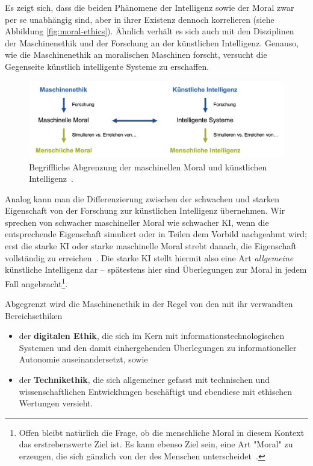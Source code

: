 \documentclass[twocolumn, german]{tum-article}
\begin{document}
Es zeigt sich, dass die beiden Phänomene der Intelligenz sowie der Moral zwar per se unabhängig sind, aber in ihrer Existenz dennoch korrelieren (siehe Abbildung \vref{fig:moral-ethics}).
Ähnlich verhält es sich auch mit den Disziplinen der Maschinenethik und der Forschung an der künstlichen Intelligenz.
Genauso, wie die Maschinenethik an moralischen Maschinen forscht, versucht die Gegenseite künstlich intelligente Systeme zu erschaffen.

\begin{figure}
	\includegraphics[width=\textwidth]{media/eth-int}
	\caption{Begriffliche Abgrenzung der maschinellen Moral und künstlichen Intelligenz~\cite[S. 17]{bendel-mascheth}.}
	\label{fig:moral-ethics}
\end{figure}

Analog kann man die Differenzierung zwischen der schwachen und starken Eigenschaft von der Forschung zur künstlichen Intelligenz übernehmen.
Wir sprechen von schwacher maschineller Moral wie schwacher KI, wenn die entsprechende Eigenschaft simuliert oder in Teilen dem Vorbild nachgeahmt wird; erst die starke KI oder starke maschinelle Moral strebt danach, die Eigenschaft vollständig zu erreichen~\cite[S. 17]{bendel-mascheth}.
Die starke KI stellt hiermit also eine Art \emph{allgemeine} künstliche Intelligenz dar -- spätestens hier sind Überlegungen zur Moral in jedem Fall angebracht\footnote{Offen bleibt natürlich die Frage, ob die menschliche Moral in diesem Kontext das erstrebenswerte Ziel ist. Es kann ebenso Ziel sein, eine Art "Moral" zu erzeugen, die sich gänzlich von der des Menschen unterscheidet~\cite[S. 23]{bendel-mascheth}.}.

Abgegrenzt wird die Maschinenethik in der Regel von den mit ihr verwandten Bereichsethiken
\begin{itemize}
	\item der \textbf{digitalen Ethik}, die sich im Kern mit informationstechnologischen Systemen und den damit einhergehenden Überlegungen zu informationeller Autonomie auseinandersetzt, sowie
	\item der \textbf{Technikethik}, die sich allgemeiner gefasst mit technischen und wissenschaftlichen Entwicklungen beschäftigt und ebendiese mit ethischen Wertungen versieht.
\end{itemize}
\end{document}
